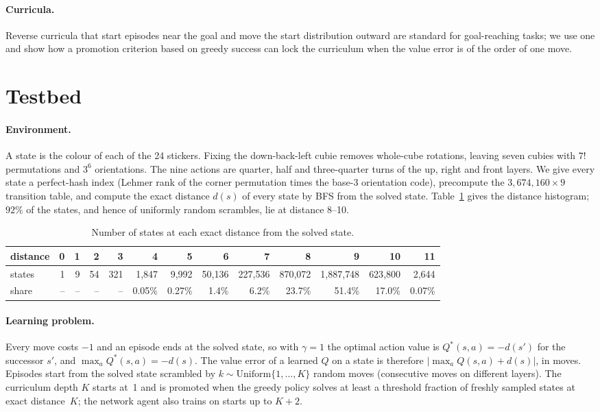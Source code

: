 \documentclass[11pt]{article}
\newcommand{\Q}{Q}
\newcommand{\dist}{d}
\begin{document}
\paragraph{Curricula.}
Reverse curricula that start episodes near the goal and move the start distribution
outward \citep{florensa2017} are standard for goal-reaching tasks; we use one and show how a
promotion criterion based on greedy success can lock the curriculum when the value error is of
the order of one move.

\section{Testbed}
\label{sec:testbed}

\paragraph{Environment.}
A state is the colour of each of the 24 stickers. Fixing the down-back-left cubie removes
whole-cube rotations, leaving seven cubies with $7!$ permutations and $3^6$ orientations. The
nine actions are quarter, half and three-quarter turns of the up, right and front layers.
We give every state a perfect-hash index (Lehmer rank of the corner permutation times the
base-3 orientation code), precompute the $3{,}674{,}160\times9$ transition table, and compute
the exact distance $\dist(s)$ of every state by BFS from the solved state. Table~\ref{tab:depth}
gives the distance histogram; $92\%$ of the states, and hence of uniformly random scrambles,
lie at distance 8--10.

\begin{table}[t]
\centering\small
\caption{Number of states at each exact distance from the solved state.}
\label{tab:depth}
\begin{tabular}{lrrrrrrrrrrrr}
\toprule
distance & 0 & 1 & 2 & 3 & 4 & 5 & 6 & 7 & 8 & 9 & 10 & 11 \\
\midrule
states & 1 & 9 & 54 & 321 & 1{,}847 & 9{,}992 & 50{,}136 & 227{,}536 & 870{,}072 & 1{,}887{,}748 & 623{,}800 & 2{,}644 \\
share  & -- & -- & -- & -- & 0.05\% & 0.27\% & 1.4\% & 6.2\% & 23.7\% & 51.4\% & 17.0\% & 0.07\% \\
\bottomrule
\end{tabular}
\end{table}

\paragraph{Learning problem.}
Every move costs $-1$ and an episode ends at the solved state, so with $\gamma=1$ the optimal
action value is $\Q^*(s,a) = -\dist(s')$ for the successor $s'$, and $\max_a \Q^*(s,a) = -\dist(s)$.
The value error of a learned $\Q$ on a state is therefore $|\max_a \Q(s,a) + \dist(s)|$, in moves.
Episodes start from the solved state scrambled by $k\sim\mathrm{Uniform}\{1,\dots,K\}$ random
moves (consecutive moves on different layers). The curriculum depth $K$ starts at~1 and is
promoted when the greedy policy solves at least a threshold fraction of freshly sampled states
at exact distance~$K$; the network agent also trains on starts up to $K+2$.
\end{document}
